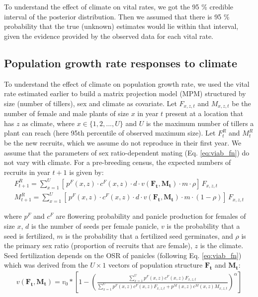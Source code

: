 \documentclass[11pt]{article}\usepackage[]{graphicx}\usepackage[usenames,dvipsnames]{xcolor}
\begin{document}
To understand the effect of climate on vital rates, we got the 95 \% credible interval of the posterior distribution.  
Then we assumed that there is 95 \% probability that the true (unknown) estimates would lie within that interval, given the evidence provided by the observed data for each vital rate.

\subsection*{Population growth rate responses to climate}
To understand the effect of climate on population growth rate, we used the vital rate estimated earlier to build a matrix projection model (MPM) structured by size (number of tillers), sex and climate as covariate.  
Let $F_{x,z,t}$ and $M_{x,z,t}$ be the number of female and male plants of size $x$ in year $t$ present at a location that has $z$ as climate, where $x \in \{1,2,...,U\}$ and $U$ is the maximum number of tillers a plant can reach (here 95th percentile of observed maximum size).
Let $F^{R}_{t}$ and $M^{R}_{t}$ be the new recruits, which we assume do not reproduce in their first year.
We assume that the parameters of sex ratio-dependent mating (Eq. \ref{eq:viab_fn}) do not vary with climate.  
For a pre-breeding census, the expected numbers of recruits in year $t+1$ is given by:
\begin{align}\label{eq:recruits}
F^{R}_{t+1} = \sum_{x=1}^{U} 	[ \, p^{F}(x,z) \cdot c^{F}(x,z) \cdot d \cdot v(\mathbf{F_{t}},\mathbf{M_{t}}) \cdot m \cdot \rho 	] \, F_{x,z,t}
\\
M^{R}_{t+1} = \sum_{x=1}^{U} 	[ \, p^{F}(x,z) \cdot c^{F}(x,z) \cdot d \cdot v(\mathbf{F_{t}},\mathbf{M_{t}}) \cdot m \cdot (1-\rho) 	] \, F_{x,z,t}
\end{align}

\noindent where $p^{F}$ and $c^{F}$ are flowering probability and panicle production for females of size $x$, $d$ is the number of seeds per female panicle, $v$ is the probability that a seed is fertilized, $m$ is the probability that a fertilized seed germinates, and $\rho$ is the primary sex ratio (proportion of recruits that are female), $z$ is the climate. 
Seed fertilization depends on the OSR of panicles (following Eq. \ref{eq:viab_fn}) which was derived from the $U \times 1$ vectors of population structure $\mathbf{F_{t}}$ and $\mathbf{M_{t}}$:
\begin{align}\label{eq:viab_MPM}
v(\mathbf{F_{t}},\mathbf{M_{t}}) = v_{0} * \left[ 1 - \left( \frac{\sum_{x=1}^{U} p^{F}(x,z) c^{F}(x,z) F_{x,z,t}}{\sum_{x=1}^{U} p^{F}(x,z) c^{F}(x,z) F_{x,z,t} + p^{M}(x,z) c^{M}(x,z) M_{x,z,t}} \right) ^{\alpha}\right]
\end{align}
\end{document}
